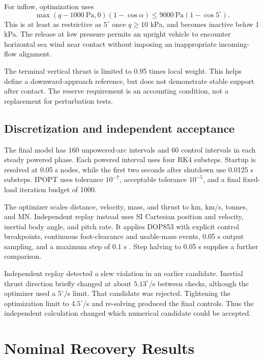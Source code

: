 \documentclass[11pt,a4paper]{article}
\begin{document}
For inflow, optimization uses
\begin{equation}
 \max(q-1000\ \mathrm{Pa},0)(1-\cos\alpha)
 \le9000\ \mathrm{Pa}(1-\cos5^\circ).
\label{eq:inflowscreen}
\end{equation}
This is at least as restrictive as $5^\circ$ once $q\ge10$ kPa, and becomes inactive below 1 kPa. The release at low pressure permits an upright vehicle to encounter horizontal sea wind near contact without imposing an inappropriate incoming-flow alignment.

The terminal vertical thrust is limited to 0.95 times local weight. This helps define a downward-approach reference, but does not demonstrate stable support after contact. The reserve requirement is an accounting condition, not a replacement for perturbation tests.

\subsection{Discretization and independent acceptance}
The final model has 160 unpowered-arc intervals and 60 control intervals in each steady powered phase. Each powered interval uses four RK4 substeps. Startup is resolved at 0.05 s nodes, while the first two seconds after shutdown use 0.0125 s substeps. IPOPT uses tolerance $10^{-7}$, acceptable tolerance $10^{-5}$, and a final fixed-load iteration budget of 1000.

The optimizer scales distance, velocity, mass, and thrust to km, km/s, tonnes, and MN. Independent replay instead uses SI Cartesian position and velocity, inertial body angle, and pitch rate. It applies DOP853 with explicit control breakpoints, continuous foot-clearance and usable-mass events, 0.05 s output sampling, and a maximum step of 0.1 s \cite{scipy,ivp}. Step halving to 0.05 s supplies a further comparison.

Independent replay detected a slew violation in an earlier candidate. Inertial thrust direction briefly changed at about $5.13^\circ$/s between checks, although the optimizer used a $5^\circ$/s limit. That candidate was rejected. Tightening the optimization limit to $4.5^\circ$/s and re-solving produced the final controls. Thus the independent calculation changed which numerical candidate could be accepted.

\section{Nominal Recovery Results}
\label{sec:results}
\end{document}
